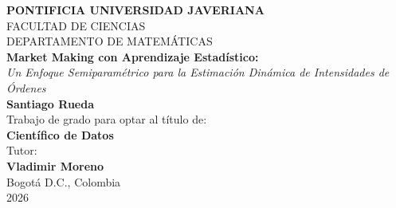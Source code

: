 \documentclass[12pt,oneside]{book}
\begin{document}
\hypersetup{pageanchor=false}

\begin{titlepage}
    \centering
    \vspace*{1cm}
    {\Large \textbf{PONTIFICIA UNIVERSIDAD JAVERIANA}} \\
    \vspace{0.5cm}
    {\large FACULTAD DE CIENCIAS} \\
    {\large DEPARTAMENTO DE MATEMÁTICAS} \\
    \vfill
    {\LARGE \textbf{Market Making con Aprendizaje Estadístico:}} \\
    \vspace{0.4cm}
    {\Large \textit{Un Enfoque Semiparamétrico para la Estimación Dinámica
    de Intensidades de Órdenes}} \\
    \vfill
    {\large \textbf{Santiago Rueda}} \\
    \vfill
    Trabajo de grado para optar al título de: \\
    \textbf{Científico de Datos} \\
    \vfill
    Tutor: \\
    \textbf{Vladimir Moreno} \\
    \vfill
    Bogotá D.C., Colombia \\
    2026
\end{titlepage}

\frontmatter
\hypersetup{pageanchor=true}
\tableofcontents
\listoftables
\listoffigures

\mainmatter













\appendix



\backmatter
\begingroup
\raggedright


\endgroup
\end{document}
